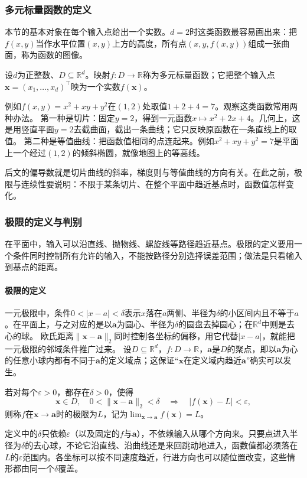 \subsubsection{多元标量函数的定义}

本节的基本对象在每个输入点给出一个实数。$d=2$时这类函数最容易画出来：把$f(x,y)$当作水平位置$(x,y)$上方的高度，所有点$(x,y,f(x,y))$组成一张曲面，称为函数的图像。
\begin{definition}[多元标量函数]
\label{def:multivariable-scalar-function}
设$d$为正整数、$D\subseteq\mathbb R^d$。映射$f:D\to\mathbb R$称为多元标量函数；它把整个输入点$\bm x=(x_1,\ldots,x_d)^\top$映为一个实数$f(\bm x)$。
\end{definition}
例如$f(x,y)=x^2+xy+y^2$在$(1,2)$处取值$1+2+4=7$。观察这类函数常用两种办法。
第一种是切片：固定$y=2$，得到一元函数$x\mapsto x^2+2x+4$。几何上，这是用竖直平面$y=2$去截曲面，截出一条曲线；它只反映原函数在一条直线上的取值。
第二种是等值曲线：把函数值相同的点连起来。例如$x^2+xy+y^2=7$是平面上一个经过$(1,2)$的倾斜椭圆，就像地图上的等高线。

后文的偏导数就是切片曲线的斜率，梯度则与等值曲线的方向有关。在此之前，极限与连续性要说明：不限于某条切片、在整个平面中趋近基点时，函数值怎样变化。

\subsubsection{极限的定义与判别}

在平面中，输入可以沿直线、抛物线、螺旋线等路径趋近基点。极限的定义要用一个条件同时控制所有允许的输入，不能按路径分别选择误差范围；做法是只看输入到基点的距离。
\paragraph{极限的定义}
\label{sec:multivariable-joint-limits}

一元极限中，条件$0<|x-a|<\delta$表示$x$落在$a$两侧、半径为$\delta$的小区间内且不等于$a$。在平面上，与之对应的是以$\bm a$为圆心、半径为$\delta$的圆盘去掉圆心；在$\mathbb R^d$中则是去心的球。
欧氏距离$\lVert\bm x-\bm a\rVert_2$同时控制各坐标的偏移，用它代替$|x-a|$，就能把一元极限的邻域条件推广过来。
设$D\subseteq\mathbb R^d$，$f:D\to\mathbb R$，$\bm a$是$D$的聚点，即以$\bm a$为心的任意小球内都有不同于$\bm a$的定义域点；这保证“$\bm x$在定义域内趋近$\bm a$”确实可以发生。
\begin{definition}[多元函数的极限]
\label{def:multivariable-limit}
若对每个$\varepsilon>0$，都存在$\delta>0$，使得
\[
 \bm x\in D,\quad 0<\lVert\bm x-\bm a\rVert_2<\delta
 \quad\Longrightarrow\quad |f(\bm x)-L|<\varepsilon,
\]
则称$f$在$\bm x\to\bm a$时的极限为$L$，记为$\lim_{\bm x\to\bm a}f(\bm x)=L$。
\end{definition}
定义中的$\delta$只依赖$\varepsilon$（以及固定的$f$与$\bm a$），不依赖输入从哪个方向来。只要点进入半径为$\delta$的去心球，不论它沿直线、沿曲线还是来回跳动地进入，函数值都必须落在$L$的$\varepsilon$范围内。各坐标可以按不同速度趋近，行进方向也可以随位置改变，这些情形都由同一个$\delta$覆盖。

